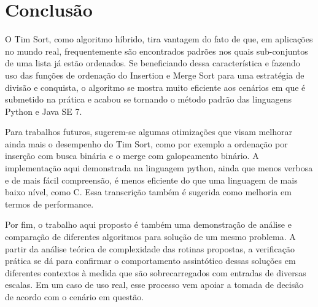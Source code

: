 \chapter*[Conclusão]{Conclusão}

O Tim Sort, como algoritmo híbrido, tira vantagem do fato de que, em aplicações no mundo real, frequentemente são encontrados padrões nos quais sub-conjuntos de uma lista já estão ordenados. Se beneficiando dessa característica e fazendo uso das funções de ordenação do Insertion e Merge Sort para uma estratégia de divisão e conquista, o algoritmo se mostra muito eficiente aos cenários em que é submetido na prática e acabou se tornando o método padrão das linguagens Python e Java SE 7.

Para trabalhos futuros, sugerem-se algumas otimizações que visam melhorar ainda mais o desempenho do Tim Sort, como por exemplo a ordenação por inserção com busca binária e o merge com galopeamento binário. A implementação aqui demonstrada na linguagem python, ainda que menos verbosa e de mais fácil compreensão, é menos eficiente do que uma linguagem de mais baixo nível, como C. Essa transcrição também é sugerida como melhoria em termos de performance.

Por fim, o trabalho aqui proposto é também uma demonstração de análise e comparação de diferentes algoritmos para solução de um mesmo problema. A partir da análise teórica de complexidade das rotinas propostas, a verificação prática se dá para confirmar o comportamento assintótico dessas soluções em diferentes contextos à medida que são sobrecarregados com entradas de diversas escalas. Em um caso de uso real, esse processo vem apoiar a tomada de decisão de acordo com o cenário em questão.